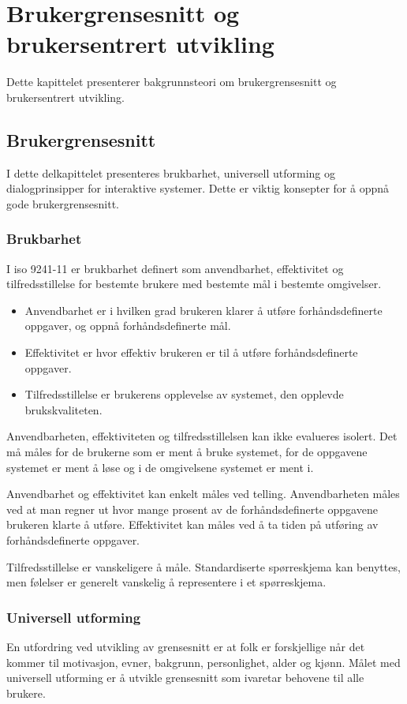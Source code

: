 \chapter{Brukergrensesnitt og brukersentrert utvikling} \label{chap:bakgrunn}
Dette kapittelet presenterer bakgrunnsteori om brukergrensesnitt og brukersentrert utvikling. 

\section{Brukergrensesnitt}

I dette delkapittelet presenteres brukbarhet, universell utforming og dialogprinsipper for interaktive systemer. Dette er viktig konsepter for å oppnå gode brukergrensesnitt. 

\subsection{Brukbarhet}
I \acrshort{iso} 9241-11 \citep{ISO9241-11} er brukbarhet definert som anvendbarhet, effektivitet og tilfredsstillelse for bestemte brukere med bestemte mål i bestemte omgivelser.
\begin{itemize}
\item Anvendbarhet er i hvilken grad brukeren klarer å utføre forhåndsdefinerte oppgaver, og oppnå forhåndsdefinerte mål.
\item Effektivitet er hvor effektiv brukeren er til å utføre forhåndsdefinerte oppgaver.
\item Tilfredsstillelse er brukerens opplevelse av systemet, den opplevde brukskvaliteten.
\end{itemize}

Anvendbarheten, effektiviteten og tilfredsstillelsen kan ikke evalueres isolert. Det må måles for de brukerne som er ment å bruke systemet, for de oppgavene systemet er ment å løse og i de omgivelsene systemet er ment i. 

Anvendbarhet og effektivitet kan enkelt måles ved telling. Anvendbarheten måles ved at man regner ut hvor mange prosent av de forhåndsdefinerte oppgavene brukeren klarte å utføre. Effektivitet kan måles ved å ta tiden på utføring av forhåndsdefinerte oppgaver.

Tilfredsstillelse er vanskeligere å måle. Standardiserte spørreskjema kan benyttes, men følelser er generelt vanskelig å representere i et spørreskjema.

\subsection{Universell utforming}
En utfordring ved utvikling av grensesnitt er at folk er forskjellige når det kommer til motivasjon, evner, bakgrunn, personlighet, alder og kjønn. Målet med universell utforming er å utvikle grensesnitt som ivaretar behovene til alle brukere.

